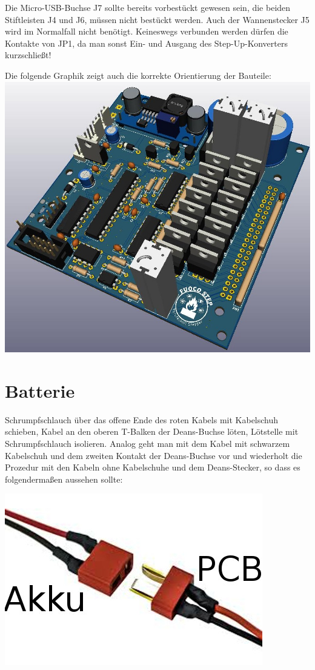 \documentclass[paper=a4, open=any]{scrbook}
\begin{document}
					Die Micro-USB-Buchse J7 sollte bereits vorbestückt gewesen sein, die beiden Stiftleisten J4 und J6, müssen nicht bestückt werden. Auch der Wannenstecker J5 wird im Normalfall nicht benötigt. Keineswegs verbunden werden dürfen die Kontakte von JP1, da man sonst Ein- und Ausgang des Step-Up-Konverters kurzschließt!

					Die folgende Graphik zeigt auch die korrekte Orientierung der Bauteile: \\
					\includegraphics[width=\textwidth]{base3d}

			\section{Batterie}

				Schrumpfschlauch über das offene Ende des roten Kabels mit Kabelschuh schieben, Kabel an den oberen T-Balken der Deans-Buchse löten, Lötstelle mit Schrumpfschlauch isolieren. Analog geht man mit dem Kabel mit schwarzem Kabelschuh und dem zweiten Kontakt der Deans-Buchse vor und wiederholt die Prozedur mit den Kabeln ohne Kabelschuhe und dem Deans-Stecker, so dass es folgendermaßen aussehen sollte:
				\begin{center}
					\includegraphics[width=.667\textwidth]{deans}
				\end{center}
\end{document}
